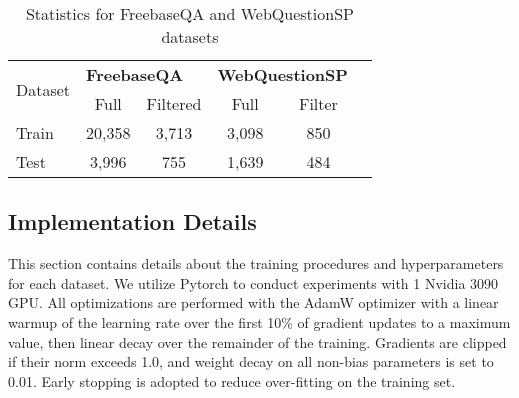 \documentclass[sigconf]{acmart}
\begin{document}
\begin{table}[!t]
        \caption{Statistics of KG completion datasets.}
        \centering
{}
        \label{tab:Dataset_Statistics_KGC}
\end{table} \begin{table}[]
\renewcommand\arraystretch{1.2}

\caption{Statistics for FreebaseQA and WebQuestionSP datasets}


\begin{tabular}{lccccc}

\toprule


\multirow{2}{*}{Dataset} & \multicolumn{2}{l}{\textbf{FreebaseQA}} & \multicolumn{2}{l}{\textbf{WebQuestionSP}} \\ \cline{2-5} 
 & Full & Filtered & Full & Filter \\
 
\midrule

Train & 20,358 & 3,713 & 3,098 & 850 \\
Test & 3,996 & 755 & 1,639 & 484  \\   

\bottomrule

\end{tabular}

\label{tab:Dataset_Statistics_KGQA}

\end{table} 

\subsection{Implementation Details}
\label{appendix:implementation_details}


This section contains details about the training procedures and hyperparameters for each dataset. 
We utilize Pytorch to conduct experiments with 1 Nvidia 3090 GPU. 
All optimizations are performed with the AdamW optimizer with a linear warmup of the learning rate over the first 10\% of gradient updates to a maximum value, then linear decay over the remainder of the training. 
Gradients are clipped if their norm exceeds 1.0, and weight decay on all non-bias parameters is set to 0.01. 
Early stopping is adopted to reduce over-fitting on the training set.
\end{document}
